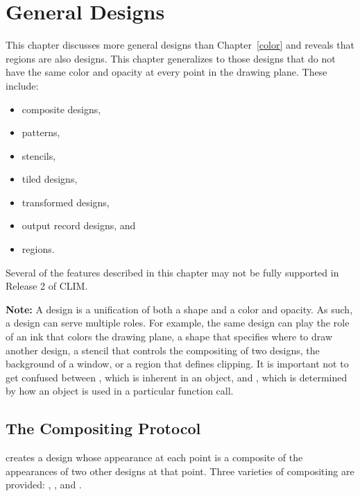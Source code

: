 
\chapter {General Designs}
\label {designs}

This chapter discusses more general designs than Chapter~\ref{color} and reveals
that regions are also designs.  This chapter generalizes to those designs that
do not have the same color and opacity at every point in the drawing plane.
These include:

\begin{itemize}
\item composite designs,

\item patterns,

\item stencils,

\item tiled designs,

\item transformed designs,

\item output record designs, and

\item regions.
\end{itemize}

Several of the features described in this chapter may not be fully supported in
Release 2 of CLIM.

{\bf Note:} A design is a unification of both a shape and a color and opacity.
As such, a design can serve multiple roles.  For example, the same design can
play the role of an ink that colors the drawing plane, a shape that specifies
where to draw another design, a stencil that controls the compositing of two
designs, the background of a window, or a region that defines clipping.  It is
important not to get confused between , which is inherent in an
object, and , which is determined by how an object is used in a
particular function call.


\section {The Compositing Protocol}

 creates a design whose appearance at each point is a
composite of the appearances of two other designs at that point.  Three
varieties of compositing are provided: ,
, and .

